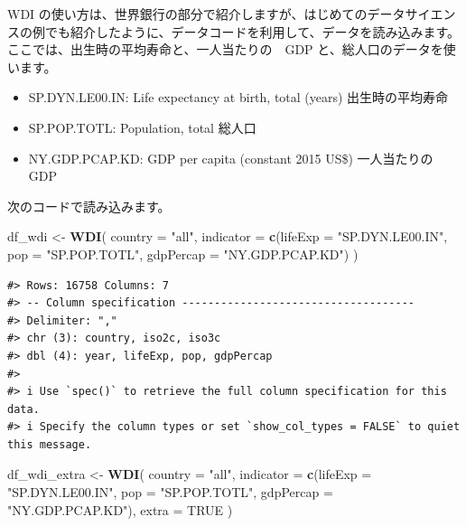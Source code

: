 \documentclass[
  xelatex, ja=standard]{bxjsbook}
\newenvironment{Shaded}{\begin{snugshade}}{\end{snugshade}}
\newcommand{\AttributeTok}[1]{\textcolor[rgb]{0.13,0.29,0.53}{#1}}
\newcommand{\ConstantTok}[1]{\textcolor[rgb]{0.56,0.35,0.01}{#1}}
\newcommand{\FunctionTok}[1]{\textcolor[rgb]{0.13,0.29,0.53}{\textbf{#1}}}
\newcommand{\NormalTok}[1]{#1}
\newcommand{\OtherTok}[1]{\textcolor[rgb]{0.56,0.35,0.01}{#1}}
\newcommand{\StringTok}[1]{\textcolor[rgb]{0.31,0.60,0.02}{#1}}
\providecommand{\tightlist}{%
  \setlength{\itemsep}{0pt}\setlength{\parskip}{0pt}}
\theoremstyle{definition}
\theoremstyle{definition}
\theoremstyle{definition}
\theoremstyle{definition}
\theoremstyle{remark}
\begin{document}
WDI の使い方は、世界銀行の部分で紹介しますが、はじめてのデータサイエンスの例でも紹介したように、データコードを利用して、データを読み込みます。ここでは、出生時の平均寿命と、一人当たりの　GDP と、総人口のデータを使います。

\begin{itemize}
\tightlist
\item
  SP.DYN.LE00.IN: Life expectancy at birth, total (years) 出生時の平均寿命
\item
  SP.POP.TOTL: Population, total 総人口
\item
  NY.GDP.PCAP.KD: GDP per capita (constant 2015 US\$) 一人当たりの　GDP
\end{itemize}

次のコードで読み込みます。

\begin{Shaded}
\begin{Highlighting}[]
\NormalTok{df\_wdi }\OtherTok{\textless{}{-}} \FunctionTok{WDI}\NormalTok{(}
  \AttributeTok{country =} \StringTok{"all"}\NormalTok{, }
  \AttributeTok{indicator =} \FunctionTok{c}\NormalTok{(}\AttributeTok{lifeExp =} \StringTok{"SP.DYN.LE00.IN"}\NormalTok{, }\AttributeTok{pop =} \StringTok{"SP.POP.TOTL"}\NormalTok{, }\AttributeTok{gdpPercap =} \StringTok{"NY.GDP.PCAP.KD"}\NormalTok{)}
\NormalTok{)}
\end{Highlighting}
\end{Shaded}

\begin{verbatim}
#> Rows: 16758 Columns: 7
#> -- Column specification ------------------------------------
#> Delimiter: ","
#> chr (3): country, iso2c, iso3c
#> dbl (4): year, lifeExp, pop, gdpPercap
#> 
#> i Use `spec()` to retrieve the full column specification for this data.
#> i Specify the column types or set `show_col_types = FALSE` to quiet this message.
\end{verbatim}

\begin{Shaded}
\begin{Highlighting}[]
\NormalTok{df\_wdi\_extra }\OtherTok{\textless{}{-}} \FunctionTok{WDI}\NormalTok{(}
  \AttributeTok{country =} \StringTok{"all"}\NormalTok{, }
  \AttributeTok{indicator =} \FunctionTok{c}\NormalTok{(}\AttributeTok{lifeExp =} \StringTok{"SP.DYN.LE00.IN"}\NormalTok{, }\AttributeTok{pop =} \StringTok{"SP.POP.TOTL"}\NormalTok{, }\AttributeTok{gdpPercap =} \StringTok{"NY.GDP.PCAP.KD"}\NormalTok{), }
  \AttributeTok{extra =} \ConstantTok{TRUE}
\NormalTok{)}
\end{Highlighting}
\end{Shaded}
\end{document}
